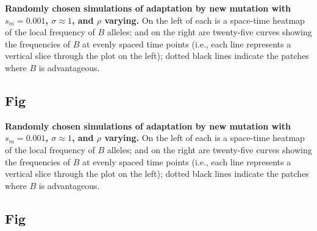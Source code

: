 \documentclass[10pt,letterpaper]{article}
\begin{document}
\textbf{Randomly chosen simulations of adaptation by new mutation
with $s_m=0.001$, $\sigma\approx 1$, and $\rho$ varying.}
    On the left of each is a space-time heatmap of the local frequency of $B$ alleles;
    and on the right are twenty-five curves showing the frequencies of $B$ at evenly spaced time points
    (i.e., each line represents a vertical slice through the plot on the left);
    dotted black lines indicate the patches where $B$ is advantageous.

\subsection{Fig}
\label{sfig:sims_4}

\textbf{Randomly chosen simulations of adaptation by new mutation
with $s_m=0.001$, $\sigma\approx 1$, and $\rho$ varying.}
    On the left of each is a space-time heatmap of the local frequency of $B$ alleles;
    and on the right are twenty-five curves showing the frequencies of $B$ at evenly spaced time points
    (i.e., each line represents a vertical slice through the plot on the left);
    dotted black lines indicate the patches where $B$ is advantageous.

\subsection{Fig}
\label{sfig:sims_5}
\end{document}
